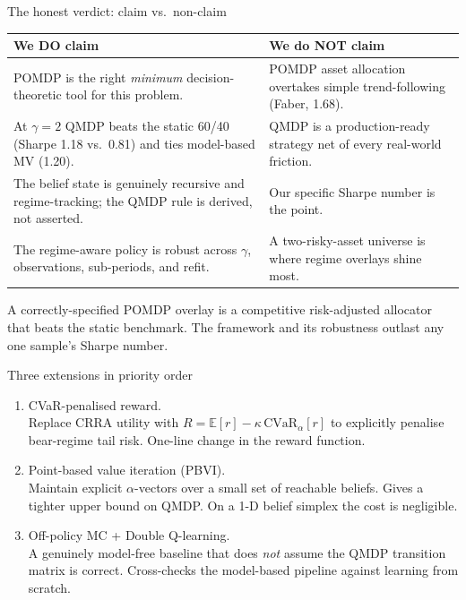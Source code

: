 \documentclass[11pt,aspectratio=169]{beamer}
\newcommand{\E}{\mathbb{E}}
\begin{document}
\begin{frame}{The honest verdict: claim vs.\ non-claim}
\centering\small\renewcommand{\arraystretch}{1.2}
\begin{tabular}{|>{\columncolor{cg!10}}p{}|>{\columncolor{cr!8}}p{}|}
\hline
\textbf{We DO claim} & \textbf{We do NOT claim} \\
\hline
POMDP is the right \emph{minimum} decision-theoretic tool for this problem. & POMDP asset allocation overtakes simple trend-following (Faber, 1.68). \\
\hline
At $\gamma{=}2$ QMDP beats the static 60/40 (Sharpe 1.18 vs.\ 0.81) and ties model-based MV (1.20). & QMDP is a production-ready strategy net of every real-world friction. \\
\hline
The belief state is genuinely recursive and regime-tracking; the QMDP rule is derived, not asserted. & Our specific Sharpe number is the point. \\
\hline
The regime-aware policy is robust across $\gamma$, observations, sub-periods, and refit. & A two-risky-asset universe is where regime overlays shine most. \\
\hline
\end{tabular}

\medskip\small
A correctly-specified POMDP overlay is a \alert{competitive risk-adjusted allocator} that beats the static benchmark. The framework and its robustness outlast any one sample's Sharpe number.
\end{frame}

\begin{frame}{Three extensions in priority order}
\bigskip
\begin{enumerate}\setlength{\itemsep}{14pt}
  \item \alert{CVaR-penalised reward.}\\
        \small Replace CRRA utility with $R = \E[r] - \kappa\,\mathrm{CVaR}_\alpha[r]$ to explicitly penalise bear-regime tail risk. One-line change in the reward function.

  \item \alert{Point-based value iteration (PBVI).}\\
        \small Maintain explicit $\alpha$-vectors over a small set of reachable beliefs. Gives a tighter upper bound on QMDP. On a 1-D belief simplex the cost is negligible.

  \item \alert{Off-policy MC + Double Q-learning.}\\
        \small A genuinely model-free baseline that does \emph{not} assume the QMDP transition matrix is correct. Cross-checks the model-based pipeline against learning from scratch.
\end{enumerate}
\end{frame}
\end{document}
